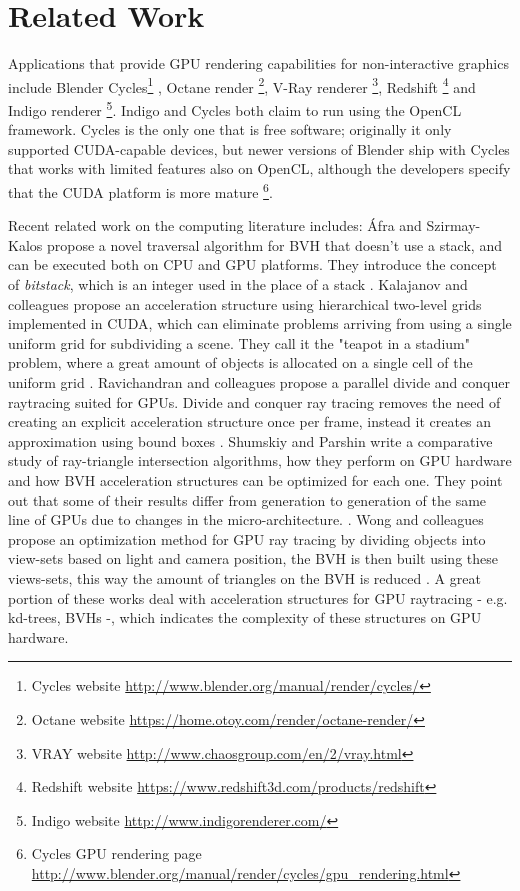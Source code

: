 \documentclass{vgtc}
\begin{document}
\section{Related Work}
\label{sec:related-work}

Applications that provide GPU rendering capabilities for
non-interactive graphics include Blender Cycles\footnote{Cycles
  website \url{http://www.blender.org/manual/render/cycles/}} , Octane
render \footnote{Octane website
  \url{https://home.otoy.com/render/octane-render/}}, V-Ray renderer
\footnote{VRAY website
  \url{http://www.chaosgroup.com/en/2/vray.html}}, Redshift
\footnote{Redshift website
  \url{https://www.redshift3d.com/products/redshift}} and Indigo
renderer \footnote{Indigo website
  \url{http://www.indigorenderer.com/}}. Indigo and Cycles both claim to
run using the OpenCL framework. Cycles is the only one that is free
software; originally it only supported CUDA-capable devices, but newer
versions of Blender ship with Cycles that works with limited features
also on OpenCL, although the developers specify that the CUDA platform
is more mature \footnote{Cycles GPU rendering page
  \url{http://www.blender.org/manual/render/cycles/gpu_rendering.html}}.

Recent related work on the computing literature includes: Áfra and
Szirmay-Kalos propose a novel traversal algorithm for BVH that doesn't
use a stack, and can be executed both on CPU and GPU platforms. They
introduce the concept of \emph{bitstack}, which is an integer used in
the place of a stack \cite{Afra}. Kalajanov and colleagues propose an
acceleration structure using hierarchical two-level grids implemented
in CUDA, which can eliminate problems arriving from using a single
uniform grid for subdividing a scene. They call it the "teapot in a stadium"
problem, where a great amount of objects is allocated on a single
cell of the uniform grid \cite{Kalojanov}. Ravichandran and colleagues
propose a parallel divide and conquer raytracing suited for
GPUs. Divide and conquer ray tracing removes the need of creating an
explicit acceleration structure once per frame, instead it creates an
approximation using bound boxes \cite{Ravichandran}. Shumskiy and
Parshin write a comparative study of ray-triangle intersection
algorithms, how they perform on GPU hardware and how BVH acceleration
structures can be optimized for each one. They point out that some of
their results differ from generation to generation of the same line
of GPUs due to changes in the micro-architecture.
\cite{Shumskiy}. Wong and colleagues propose an optimization method
for GPU ray tracing by dividing objects into view-sets based on light
and camera position, the BVH is then built using these views-sets,
this way the amount of triangles on the BVH is reduced \cite{Wong}. A
great portion of these works deal with acceleration structures for GPU
raytracing - e.g. kd-trees, BVHs -, which indicates the complexity of
these structures on GPU hardware.
\end{document}
